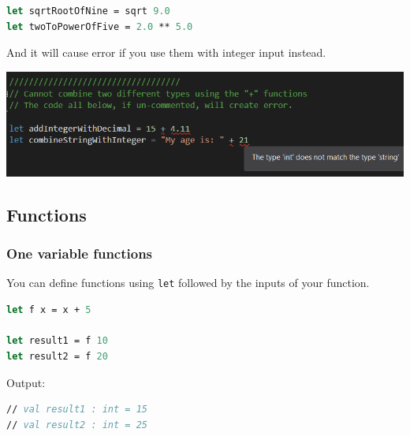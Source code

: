 \documentclass[12pt]{article}
\begin{document}
\begin{lstlisting}[language=FSharp]
let sqrtRootOfNine = sqrt 9.0
let twoToPowerOfFive = 2.0 ** 5.0 
\end{lstlisting}
And it will cause error if you use them with integer input instead.
\begin{center}
\includegraphics[width=14cm]{pictures/picture04.png}
\end{center}

\pagebreak
\subsection{Functions}

\subsubsection{One variable functions}

You can define functions using \texttt{let} followed by the inputs of your function.

\begin{lstlisting}[language=FSharp]
let f x = x + 5

let result1 = f 10
let result2 = f 20
\end{lstlisting}
Output:
\begin{lstlisting}[language=FSharp]
// val result1 : int = 15
// val result2 : int = 25
\end{lstlisting}
\end{document}
